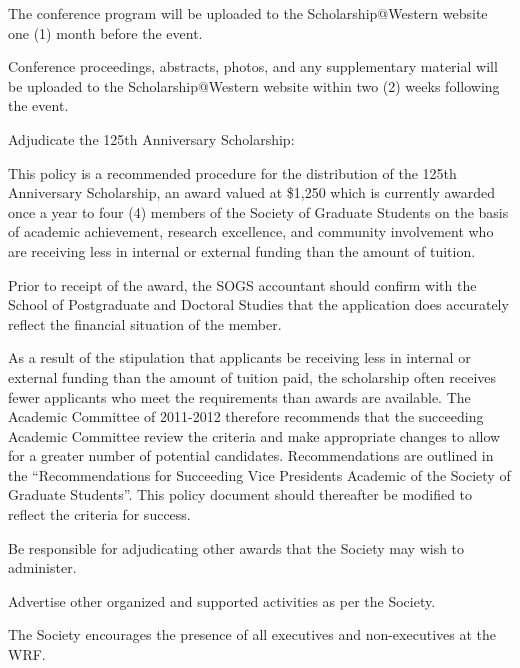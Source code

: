 \begin{longenum}[ label*=\thesubsection.\arabic*., align=left]
\begin{longenum}[ label*=\arabic*., align=left]
\begin{longenum}[ label*=\arabic*., align=left]
		\item The conference program will be uploaded to the Scholarship@Western website one (1) month before the event.
		\item Conference proceedings, abstracts, photos, and any supplementary material will be uploaded to the Scholarship@Western website within two (2) weeks following the event.
		\end{longenum}
	\item Adjudicate the 125th Anniversary Scholarship:
		\begin{longenum}[ label*=\arabic*., align=left] 
		\item This policy is a recommended procedure for the distribution of the 125th Anniversary Scholarship, an award valued at \$1,250 which is currently awarded once a year to four (4) members of the Society of Graduate Students on the basis of academic achievement, research excellence, and community involvement who are receiving less in internal or external funding than the amount of tuition.
		\item Prior to receipt of the award, the SOGS accountant should confirm with the School of Postgraduate and Doctoral Studies that the application does accurately reflect the financial situation of the member.
		\item As a result of the stipulation that applicants be receiving less in internal or external funding than the amount of tuition paid, the scholarship often receives fewer applicants who meet the requirements than awards are available. The Academic Committee of 2011-2012 therefore recommends that the succeeding Academic Committee review the criteria and make appropriate changes to allow for a greater number of potential candidates. Recommendations are outlined in the “Recommendations for Succeeding Vice Presidents Academic of the Society of Graduate Students”. This policy document should thereafter be modified to reflect the criteria for success.
		\end{longenum}
	\item Be responsible for adjudicating other awards that the Society may wish to administer.
	\item Advertise other organized and supported activities as per the Society.
	\end{longenum}
\item The Society encourages the presence of all executives and non-executives at the WRF.
\end{longenum}	